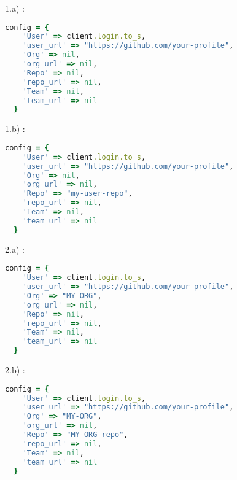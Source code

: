 \begin{minipage}[t]{0.5\linewidth}
  1.a) :
  \begin{lstlisting}[language=Ruby]
    config = {
    'User' => client.login.to_s,
  	'user_url' => "https://github.com/your-profile",
    'Org' => nil,
    'org_url' => nil,
    'Repo' => nil,
    'repo_url' => nil,
    'Team' => nil,
    'team_url' => nil
  }
  \end{lstlisting}
\end{minipage}
\begin{minipage}[t]{0.5\linewidth}
    1.b) :
  \begin{lstlisting}[language=Ruby]
    config = {
    'User' => client.login.to_s,
  	'user_url' => "https://github.com/your-profile",
    'Org' => nil,
    'org_url' => nil,
    'Repo' => "my-user-repo",
    'repo_url' => nil,
    'Team' => nil,
    'team_url' => nil
  }
  \end{lstlisting}
\end{minipage}

\bigskip

\begin{minipage}[t]{0.5\linewidth}
  2.a) :
  \begin{lstlisting}[language=Ruby]
    config = {
    'User' => client.login.to_s,
  	'user_url' => "https://github.com/your-profile",
    'Org' => "MY-ORG",
    'org_url' => nil,
    'Repo' => nil,
    'repo_url' => nil,
    'Team' => nil,
    'team_url' => nil
  }
  \end{lstlisting}
\end{minipage}
\begin{minipage}[t]{0.5\linewidth}
    2.b) :
  \begin{lstlisting}[language=Ruby]
    config = {
    'User' => client.login.to_s,
  	'user_url' => "https://github.com/your-profile",
    'Org' => "MY-ORG",
    'org_url' => nil,
    'Repo' => "MY-ORG-repo",
    'repo_url' => nil,
    'Team' => nil,
    'team_url' => nil
  }
  \end{lstlisting}
\end{minipage}

\bigskip

